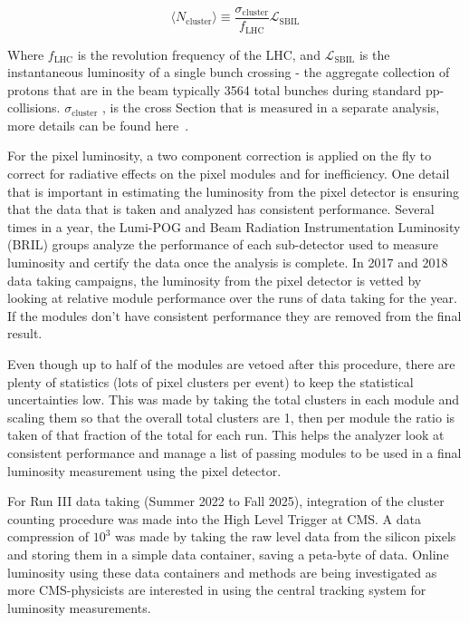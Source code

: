 \begin{equation}
\langle N_{\text{cluster}}\rangle\equiv\frac{\sigma_{\text{cluster}}}{f_{\text{LHC}}}\mathcal{L}_{\text{SBIL}}
\end{equation}

Where $f_{\text{LHC}}$ is the revolution frequency of the LHC, and $\mathcal{L}_{\text{SBIL}}$ is the instantaneous luminosity of a single bunch crossing - the aggregate collection of protons that are in the beam typically 3564 total bunches during standard pp-collisions. $\sigma_{\text{cluster}}$ , is the cross Section that is measured in a separate analysis, more details can be found here~\cite{HIG-16-002}. 



For the pixel luminosity, a two component correction is applied on the fly to correct for radiative effects on the pixel modules and for inefficiency.  
One detail that is important in estimating the luminosity from the pixel detector is ensuring that the data that is taken and analyzed has consistent performance. Several times in a year, the Lumi-POG and Beam Radiation Instrumentation Luminosity (BRIL) groups analyze the performance of each sub-detector used to measure luminosity and certify the data once the analysis is complete. In 2017 and 2018 data taking campaigns, the luminosity from the pixel detector is vetted by looking at relative module performance over the runs of data taking for the year. If the modules don't have consistent performance they are removed from the final result. 

Even though up to half of the modules are vetoed after this procedure, there are plenty of statistics (lots of pixel clusters per event) to keep the statistical uncertainties low. 
This was made by taking the total clusters in each module and scaling them so that the overall total clusters are 1, then per module the ratio is taken of that fraction of the total for each run. This helps the analyzer look at consistent performance and manage a list of passing modules to be used in a final luminosity measurement using the pixel detector. 

For Run III data taking (Summer 2022 to Fall 2025), integration of the cluster counting procedure was made into the High Level Trigger at CMS. A data compression of $10^3$ was made by taking the raw level data from the silicon pixels and storing them in a simple data container, saving a peta-byte of data. Online luminosity using these data containers and methods are being investigated as more CMS-physicists are interested in using the central tracking system for luminosity measurements.

